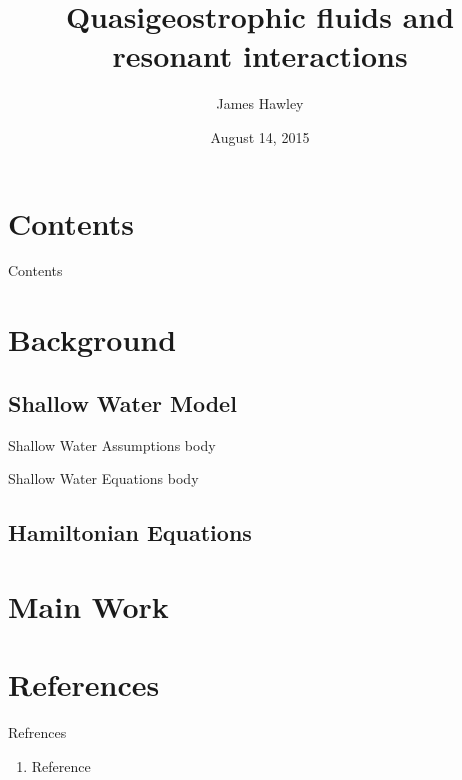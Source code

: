 \documentclass{beamer}
\title{Quasigeostrophic fluids and resonant interactions}
\author{James Hawley}
\date{August 14, 2015}
\institute{University of Waterloo}
\begin{document}
	\begin{frame}
		\titlepage
	\end{frame}

	\section*{Contents}
		\begin{frame}{Contents}
			\tableofcontents
		\end{frame}

	\section{Background}
		\subsection{Shallow Water Model}
			\begin{frame}[t]{Shallow Water Assumptions}
				body
			\end{frame}
			\begin{frame}[t]{Shallow Water Equations}
				body
			\end{frame}
		\subsection{Hamiltonian Equations}

	\section{Main Work}

	\section{References}
		\begin{frame}{Refrences}
			\begin{enumerate}
				\item Reference
			\end{enumerate}
		\end{frame}
\end{document}
